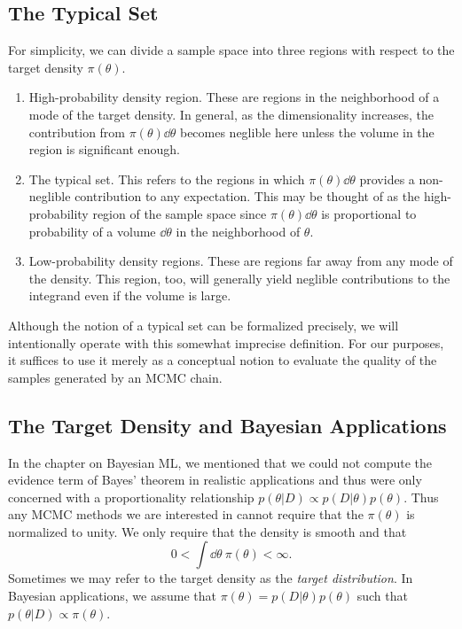 \subsection{The Typical Set}
For simplicity, we can divide a
sample space into three regions with respect to the target density $\pi(\theta)$.
\begin{enumerate}
    \item High-probability density region. These are regions in the neighborhood of a mode of the target density.
    In general, as the dimensionality increases, the contribution from $\pi(\theta) \dd \theta$ becomes neglible here 
    unless the volume in the region is significant enough.
    \item The typical set. This refers to the regions in which $\pi(\theta) \dd \theta$ provides a non-neglible contribution
    to any expectation. This may be thought of as the high-probability region of the sample space
    since $\pi(\theta) \dd \theta$ is proportional to probability of a volume $\dd\theta$ in the neighborhood of $\theta$. 
    \item Low-probability density regions. These are regions far away from any mode of the density. This region, too, will generally
    yield neglible contributions to the integrand even if the volume is large.
\end{enumerate}
Although the notion of a typical set can be formalized precisely, we will intentionally 
operate with this somewhat imprecise definition. For our purposes, it suffices to use it merely as
a conceptual notion to evaluate the quality of the samples generated by an MCMC chain. 
\subsection{The Target Density and Bayesian Applications}
In the chapter on Bayesian ML, we mentioned that we could not compute the evidence term of Bayes' theorem in 
realistic applications and thus were only concerned with a proportionality relationship $p(\theta|D)\propto p(D|\theta)p(\theta)$. Thus any MCMC methods we are interested in cannot require that the $\pi(\theta)$ is normalized to unity. We only require that the density is smooth and that 
\begin{equation}
  0 < \int \dd\theta \ \pi(\theta) < \infty.
\end{equation} 
Sometimes we may refer to the target density as the \textit{target distribution}.
In Bayesian applications, we assume that $\pi(\theta) = p(D|\theta)p(\theta)$ such that $p(\theta|D) \propto \pi(\theta)$.

